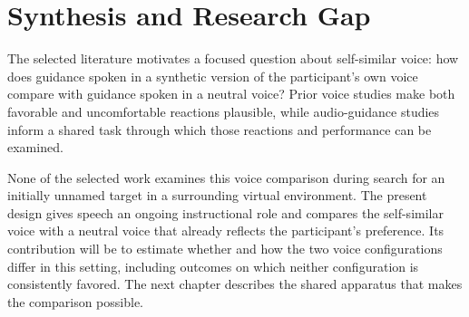 \section{Synthesis and Research Gap}
The selected literature motivates a focused question about self-similar voice: how does guidance spoken in a synthetic version of the participant's own voice compare with guidance spoken in a neutral voice? Prior voice studies make both favorable and uncomfortable reactions plausible, while audio-guidance studies inform a shared task through which those reactions and performance can be examined.

None of the selected work examines this voice comparison during search for an initially unnamed target in a surrounding virtual environment. The present design gives speech an ongoing instructional role and compares the self-similar voice with a neutral voice that already reflects the participant's preference. Its contribution will be to estimate whether and how the two voice configurations differ in this setting, including outcomes on which neither configuration is consistently favored. The next chapter describes the shared apparatus that makes the comparison possible.
